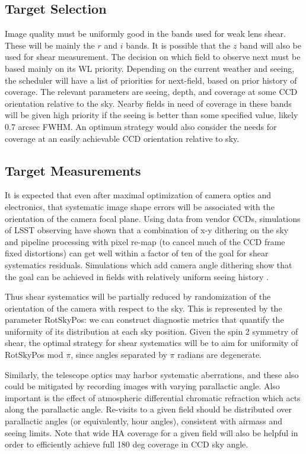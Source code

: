 \subsection{Target Selection}

Image quality must be uniformly good in the bands used for weak lens shear.
These will be mainly the $r$ and $i$ bands. It is possible that the $z$ band
will also be used for shear measurement.  The decision on which field to observe
next must be based mainly on its WL priority.  Depending on the current weather
and seeing, the scheduler will have a list of priorities for next-field, based
on prior history of coverage.  The relevant parameters are seeing, depth, and
coverage at some CCD orientation relative to the sky.  Nearby fields in need of
coverage in these bands will be given high priority if the seeing is better than
some specified value, likely 0.7 arcsec FWHM. An optimum strategy would also
consider the needs for coverage at an easily achievable CCD orientation relative
to sky.


\subsection{Target Measurements}

It is expected that even after maximal optimization of camera optics and
electronics, that systematic image shape errors will be associated with the
orientation of the camera focal plane.  Using data from vendor CCDs, simulations
of LSST observing have shown that a combination of x-y dithering on the sky and
pipeline processing with pixel re-map (to cancel much of the CCD frame fixed
distortions) can get well within a factor of ten of the goal for shear
systematics residuals.  Simulations which add camera angle dithering show that
the goal can be achieved in fields with relatively uniform seeing history
\citep{Jee&Tyson2011}.

Thus shear systematics will be partially reduced by randomization of the
orientation of the camera with respect to the sky.  This is represented by the
parameter RotSkyPos: we can construct diagnostic metrics that quantify the
uniformity of its distribution at each sky position.   Given the spin 2 symmetry
of shear, the optimal strategy for shear systematics will be to aim for
uniformity of RotSkyPos mod $\pi$, since angles separated by $\pi$ radians are
degenerate.

Similarly, the telescope optics may harbor systematic aberrations, and these
also could be mitigated by recording images with varying parallactic angle.
Also important is the effect of atmospheric differential chromatic refraction
which acts along the parallactic angle.  Re-visits to a given field should be
distributed over parallactic angles (or equivalently, hour angles), consistent
with airmass and seeing limits.  Note that wide HA coverage for a given field
will also  be helpful in order to efficiently achieve full 180 deg coverage in
CCD sky angle.


